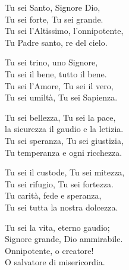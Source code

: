 
\strofa Tu sei Santo, Signore Dio,\\
Tu sei forte, Tu sei grande.\\
Tu sei l'Altissimo, l'onnipotente,\\
Tu Padre santo, re del cielo.

\spazio

\strofa Tu sei trino, uno Signore,\\
Tu sei il bene, tutto il bene.\\
Tu sei l'Amore, Tu sei il vero,\\
Tu sei umiltà, Tu sei Sapienza.

\spazio

\strofa Tu sei bellezza, Tu sei la pace,\\
la sicurezza il gaudio e la letizia.\\
Tu sei speranza, Tu sei giustizia,\\
Tu temperanza e ogni ricchezza.

\spazio

\strofa Tu sei il custode, Tu sei mitezza,\\
Tu sei rifugio, Tu sei fortezza.\\
Tu carità, fede e speranza,\\
Tu sei tutta la nostra dolcezza.

\spazio

\strofa Tu sei la vita, eterno gaudio;\\
Signore grande, Dio ammirabile.\\
Onnipotente, o creatore!\\
O salvatore di misericordia.